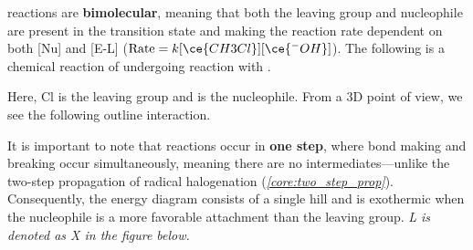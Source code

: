 \documentclass[10pt]{article}
\begin{document}
    \begin{core}[label=core:snt]{\snt}
      
      \snt reactions are \textbf{bimolecular}, meaning that both the leaving group and nucleophile are present in the transition state and making the reaction rate dependent on both [Nu] and [E-L] ($\text{Rate} = k[\ce{CH3Cl}][\ce{^-OH}]$). The following is a chemical reaction of  undergoing \snt reaction with .

      \vspace{15pt}

      Here, Cl is the leaving group and  is the nucleophile. From a 3D point of view, we see the following outline interaction.


      It is important to note that \snt reactions occur in \textbf{one step}, where bond making and breaking occur simultaneously, meaning there are no intermediates---unlike the two-step propagation of radical halogenation (\textit{\autoref{core:two_step_prop}}). Consequently, the energy diagram consists of a single hill and is exothermic when the nucleophile is a more favorable attachment than the leaving group. \textit{L is denoted as X in the figure below.}


\end{core}
\end{document}
